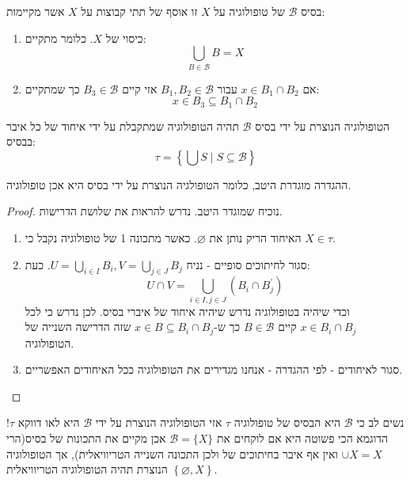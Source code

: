 \documentclass{tstextbook}
\begin{document}
\begin{definition}
בסיס \(\mathcal{B}\) של טופולוגיה על \(X\) זו אוסף של תתי קבוצות על \(X\) אשר מקיימות:

  \begin{enumerate}
    \item כיסוי של \(X\). כלומר מתקיים: 
$$\bigcup_{B\in{\mathcal{B}}}B=X$$


    \item אם \(x \in B_{1}\cap B_{2}\) עבור \(B_{1},B_{2}\in \mathcal{B}\) אזי קיים \(B_{3} \in \mathcal{B}\) כך שמתקיים: 
$$x\in B_{3}\subseteq B_{1}\cap B_{2}$$


  \end{enumerate}
\end{definition}
\begin{definition}
הטופולוגיה הנוצרת על ידי בסיס \(\mathcal{B}\) תהיה הטופולוגיה שמתקבלת על ידי איחוד של כל איבר בבסיס:
$$\tau=\left\{\bigcup S\mid S\subseteq\mathcal{B}\right\}$$

\end{definition}
\begin{lemma}
ההגדרה מוגדרת היטב, כלומר הטופולגיה הנוצרת על ידי בסיס היא אכן טופולוגיה.

\end{lemma}
\begin{proof}
נוכיח שמוגדר היטב. נדרש להראות את שלושת הדרישות.

  \begin{enumerate}
    \item האיחוד הריק נותן את \(\varnothing\). כאשר מתכונה 1 של טופולוגיה נקבל כי \(X \in \tau\). 


    \item סגור לחיתוכים סופיים - נניח \(U=\bigcup_{i \in I}B_{i},V=\bigcup_{j \in J}B_{j}\). כעת: 
$$U\cap V=\bigcup_{i\in I,j\in J}(B_{i}\cap B_{j}^{\prime})$$
וכדי שיהיה בטופולוגיה נדרש שיהיה איחוד של איברי בסיס. לכן נדרש כי לכל \(x \in B_{i}\cap B_{j}\) קיים \(B \in \mathcal{B}\) כך ש-\(x \in B\subseteq B_{i}\cap B_{j}\) שזה הדרישה השנייה של הטופולוגיה.


    \item סגור לאיחודים - לפי ההגדרה - אנחנו מגדירים את הטופולוגיה ככל האיחודים האפשריים. 


  \end{enumerate}
\end{proof}
\begin{remark}
נשים לב כי \(\mathcal{B}\) היא הבסיס של טופולוגיה \(\tau\) אזי הטופולוגיה הנוצרת על ידי \(\mathcal{B}\) היא לאו דווקא \(\tau\)! הדוגמא הכי פשוטה היא אם לוקחים את \(\mathcal{B}=\{ X \}\) אכן מקיים את התכונות של בסיס(הרי \(\cup X=X\) ואין אף איבר בחיתוכים של ולכן התכונה השנייה הטריוויאלית), אך הטופולוגיה הנוצרת תהיה הטופולוגיה הטריוויאלית \(\left\{  \varnothing,X  \right\}\).

\end{remark}
\end{document}
